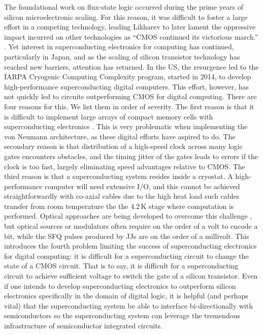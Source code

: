 \documentclass[twocolumn]{article}
\begin{document}
The foundational work on flux-state logic \cite{lise1991,buli2001,li2012} occurred during the prime years of silicon microelectronic scaling. For this reason, it was difficult to foster a large effort in a competing technology, leading Likharev to later lament the oppressive impact incurred on other technologies as ``CMOS continued its victorious march.'' \cite{}. Yet interest in superconducting electronics for computing has continued, particularly in Japan, and as the scaling of silicon transistor technology has reached new barriers, attention has returned. In the US, the resurgence led to the IARPA Cryogenic Computing Complexity program, started in 2014, to develop high-performance superconducting digital computers. This effort, however, has not quickly led to circuits outperforming CMOS for digital computing. There are four reasons for this. We list them in order of severity. The first reason is that it is difficult to implement large arrays of compact memory cells with superconducting electronics \cite{}. This is very problematic when implementing the von Neumann architecture, as these digital efforts have aspired to do. The secondary reason is that distribution of a high-speed clock across many logic gates encounters obstacles, and the timing jitter of the gates leads to errors if the clock is too fast, largely eliminating speed advantages relative to CMOS. The third reason is that a superconducting system resides inside a cryostat. A high-performance computer will need extensive I/O, and this cannot be achieved straightforwardly with co-axial cables due to the high heat load such cables transfer from room temperature the the 4.2\,K stage where computation is performed. Optical approaches are being developed to overcome this challenge \cite{}, but optical sources or modulators often require on the order of a volt to encode a bit, while the SFQ pulses produced by JJs are on the order of a millivolt. This introduces the fourth problem limiting the success of superconducting electronics for digital computing: it is difficult for a superconducting circuit to change the state of a CMOS circuit. That is to say, it is difficult for a superconducting circuit to achieve sufficient voltage to switch the gate of a silicon transistor. Even if one intends to develop superconducting electronics to outperform silicon electronics specifically in the domain of digital logic, it is helpful (and perhaps vital) that the superconducting system be able to interface bi-directionally with semiconductors so the superconducting system can leverage the tremendous infrastructure of semiconductor integrated circuits. 
\end{document}
